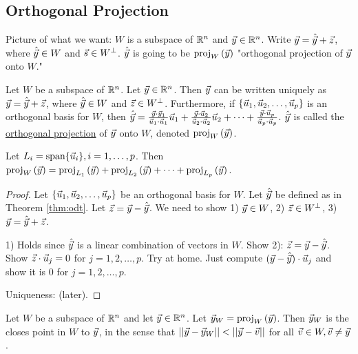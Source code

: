 \documentclass[10pt,a4paper]{article}
\begin{document}
\subsection{Orthogonal Projection}
Picture of what we want: $W$ is a subspace of $\mathbb{R}^n$ and $\vec{y}\in\mathbb{R}^n$. Write $\vec{y}=\hat{\vec{y}}+\vec{z}$, where $\hat{\vec{y}}\in W$ and $\vec{s}\in W^\perp$. $\hat{\vec{y}}$ is going to be $\text{proj}_{W}\left(\vec{y}\right)$ "orthogonal projection of $\vec{y}$ onto $W$."
\begin{theorem}
	Let $W$ be a subspace of $\mathbb{R}^n$. Let $\vec{y}\in\mathbb{R}^n$. Then $\vec{y}$ can be written uniquely as $\vec{y} = \hat{\vec{y}}+\vec{z}$, where $\hat{\vec{y}}\in W$ and $\vec{z}\in W^\perp$. Furthermore, if $\{\vec{u}_1,\vec{u}_2,\dots,\vec{u}_p\}$ is an orthogonal basis for $W$, then $\hat{\vec{y}} = \frac{\vec{y}\cdot\vec{y}_1}{\vec{u}_1\cdot\vec{u}_1}\vec{u}_1 + \frac{\vec{y}\cdot\vec{u}_2}{\vec{u}_2\cdot\vec{u}_2}\vec{u}_2 + \cdots + \frac{\vec{y}\cdot\vec{u}_p}{\vec{u}_p\cdot\vec{u}_p}$. $\hat{\vec{y}}$ is called the \underline{orthogonal projection} of $\vec{y}$ onto $W$, denoted $\text{proj}_{W}\left(\vec{y}\right)$.
	\label{thm:odt}
\end{theorem}
\begin{recall}
	Let $L_i = \text{span}\{\vec{u}_i\},i=1,\dots,p$. Then $\text{proj}_{W}\left(\vec{y}\right) = \text{proj}_{L_1}\left(\vec{y}\right) + \text{proj}_{L_2}\left(\vec{y}\right) + \cdots + \text{proj}_{L_p}\left(\vec{y}\right)$.
\end{recall}
\begin{proof}
	Let  $\{\vec{u}_1,\vec{u}_2,\dots,\vec{u}_p\}$ be an orthogonal basis for $W$. Let  $\hat{\vec{y}}$ be defined as in Theorem \ref{thm:odt}. Let $\vec{z} = \vec{y}-\hat{\vec{y}}$. We need to show 1) $\vec{y}\in W$, 2) $\vec{z}\in W^\perp$, 3) $\vec{y}=\hat{\vec{y}}+\vec{z}$.
	
	1) Holds since $\hat{\vec{y}}$ is a linear combination of vectors in $W$. Show 2): $\vec{z}=\vec{y}-\hat{\vec{y}}$. Show $\vec{z}\cdot\vec{u}_j=0$ for $j=1,2,\dots,p$. Try at home. Just compute $(\vec{y}-\hat{\vec{y}})\cdot\vec{u}_j$ and show it is 0 for $j=1,2,\dots,p$.
	
	Uniqueness: (later).
\end{proof}
\begin{theorem}
	Let $W$ be a subspace of $\mathbb{R}^n$ and let $\vec{y}\in\mathbb{R}^n$. Let $\vec{y}_W = \text{proj}_{W}\left(\vec{y}\right)$. Then $\vec{y}_W$ is the closes point in $W$ to $\vec{y}$, in the sense that $||\vy-\vy_W||<||\vy-\vv||$ for all $\vec{v}\in W,\vec{v}\neq\vec{y}$.
\end{theorem}
\end{document}

